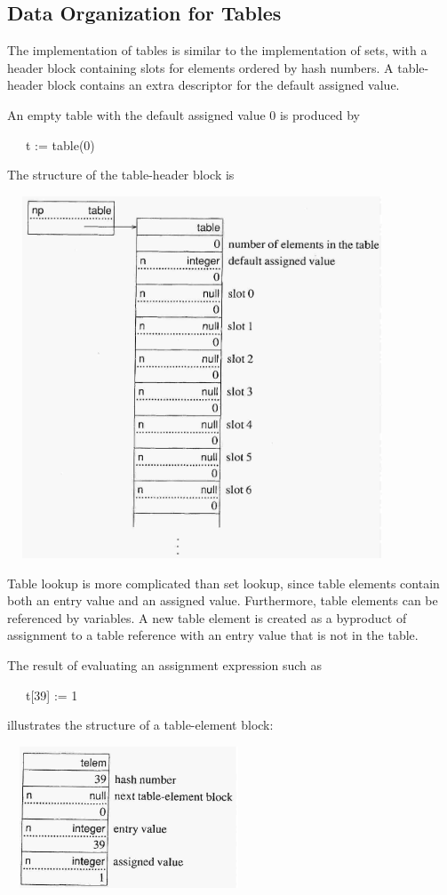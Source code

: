 \subsection{Data Organization for Tables}

The implementation of tables is similar to the implementation of sets,
with a header block containing slots for elements ordered by hash
numbers. A table-header block contains an extra descriptor for the
default assigned value.

An empty table with the default assigned value 0 is produced by

{\ttfamily\mdseries
\ \ \ t := table(0)}

The structure of the table-header block is

\ \  \includegraphics[width=4.2752in,height=4.2417in]{ib-img/ib-img037.jpg} 

Table lookup is more complicated than set lookup, since table elements
contain both an entry value and an assigned value. Furthermore, table
elements can be referenced by variables. A new table element is
created as a byproduct of assignment to a table reference with an
entry value that is not in the table.

The result of evaluating an assignment expression such as

{\ttfamily\mdseries
\ \ \ t[39] := 1}

\noindent illustrates the structure of a table-element block:

\ \  \includegraphics[width=2.5654in,height=1.6634in]{ib-img/ib-img038.jpg} 

